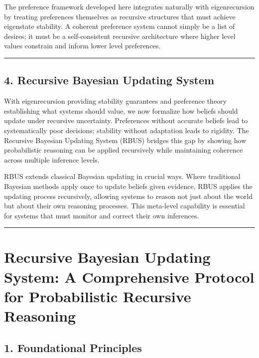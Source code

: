 \documentclass[
]{article}
\begin{document}
The preference framework developed here integrates naturally with
eigenrecursion by treating preferences themselves as recursive
structures that must achieve eigenstate stability. A coherent preference
system cannot simply be a list of desires; it must be a self-consistent
recursive architecture where higher level values constrain and inform
lower level preferences.

\begin{center}\rule{0.5\linewidth}{0.5pt}\end{center}

\subsection{4. Recursive Bayesian Updating
System}\label{4-recursive-bayesian-updating-system}

With eigenrecursion providing stability guarantees and preference theory
establishing what systems should value, we now formalize how beliefs
should update under recursive uncertainty. Preferences without accurate
beliefs lead to systematically poor decisions; stability without
adaptation leads to rigidity. The Recursive Bayesian Updating System
(RBUS) bridges this gap by showing how probabilistic reasoning can be
applied recursively while maintaining coherence across multiple
inference levels.

RBUS extends classical Bayesian updating in crucial ways. Where
traditional Bayesian methods apply once to update beliefs given
evidence, RBUS applies the updating process recursively, allowing
systems to reason not just about the world but about their own reasoning
processes. This meta-level capability is essential for systems that must
monitor and correct their own inferences.

\begin{center}\rule{0.5\linewidth}{0.5pt}\end{center}

\section{Recursive Bayesian Updating System: A Comprehensive Protocol
for Probabilistic Recursive
Reasoning}\label{recursive-bayesian-updating-system-a-comprehensive-protocol-for-probabilistic-recursive-reasoning}

\subsection{1. Foundational Principles}\label{foundational-principles}
\end{document}
